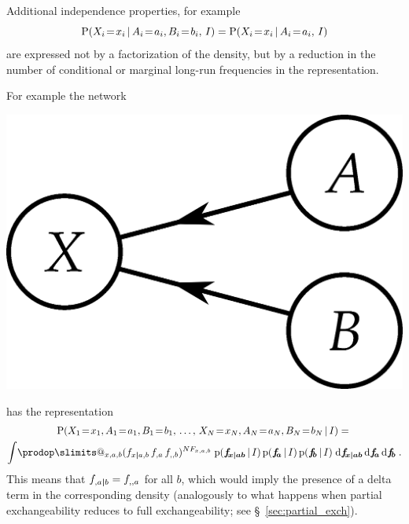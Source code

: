 \documentclass[\ifafour a4paper,12pt,\else a5paper,10pt,\fi%
onecolumn,oneside,article,%
british%
]{memoir}
\makeatletter
\theoremstyle{remark}
\theoremstyle{innote}
\def\prod{\DOTSI\prodop\slimits@}
\newcommand*{\di}{\mathrm{d}}%
\newcommand*{\pf}{\mathrm{p}}%
\newcommand*{\p}{\mathrm{P}}%
\renewcommand*{\|}[1][]{\nonscript\,#1\vert\nonscript\,\mathopen{}}
\newcommand*{\sect}{\S}%
\renewcommand*{\=}{\TextOrMath\texteq\eq}
\newcommand*{\X}[1]{X_{#1}}
\newcommand*{\x}[1]{x_{#1}}
\newcommand*{\A}[1]{A_{#1}}
\newcommand*{\va}[1]{a_{#1}}
\newcommand*{\B}[1]{B_{#1}}
\newcommand*{\vb}[1]{b_{#1}}
\newcommand*{\ff}[1]{f_{#1}}
\newcommand*{\ffb}[1]{\bm{f_{\!#1}}}
\newcommand*{\FF}[1]{F_{#1}}
\newcommand*{\bcond}[1][]{\nonscript\,#1\bm{\vert}\nonscript\;\mathopen{}}
\makeatother
\begin{document}
Additional independence properties, for example
\begin{equation}
  \label{eq:example_independence}
  \p( \X{i}\=\x{i} \| \A{i}\=\va{i}, \B{i}\=\vb{i},\, I)
  =   \p( \X{i}\=\x{i} \| \A{i}\=\va{i},\, I)
\end{equation}
are expressed not by a factorization of the density, but by a reduction in
the number of conditional or marginal long-run frequencies in the
representation.

For example the network
\begin{center}%
\includegraphics[scale=0.5]{bayesnet3s.png}
\end{center}%
has the representation
\begin{multline}
  \label{eq:example1sep}
  \p( \X{1}\=\x{1}, \A{1}\=\va{1}, \B{1}\=\vb{1},\, \dotsc,\,
   \X{N}\=\x{N}, \A{N}\=\va{N}, \B{N}\=\vb{N} \| I) ={}\\
     \int\!\prod_{x,a,b}
     (\ff{x \bcond a,b}\, \ff{,a}\, \ff{,,b})^{N \FF{x,a,b}}\;%
\pf(\ffb{x \bcond ab}\|I)\,\pf(\ffb{a}\|I)\,\pf(\ffb{b}\|I)
\;\di\ffb{x \bcond ab} \,\di\ffb{a} \,\di\ffb{b} \;.
\end{multline}
This means that $\ff{,a \bcond b} = \ff{,,a}$ for all $b$, which would
imply the presence of a delta term in the corresponding density
(analogously to what happens when partial exchangeability reduces to full
exchangeability; see \sect~\ref{sec:partial_exch}).
\end{document}
